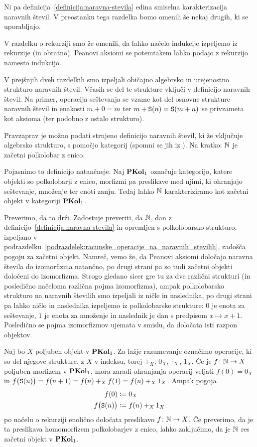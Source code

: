 Ni pa definicija~\ref{definicija:naravna-stevila} edina smiselna karakterizacija naravnih števil. V preostanku tega razdelka bomo omenili še nekaj drugih, ki se uporabljajo.

V razdelku o rekurziji smo že omenili, da lahko načelo indukcije izpeljemo iz rekurzije (in obratno). Peanovi aksiomi se potemtakem lahko podajo z rekurzijo namesto indukcijo.

V prejšnjih dveh razdelkih smo izpeljali običajno algebrsko in urejenostno strukturo naravnih števil. Včasih se del te strukture vključi v definicijo naravnih števil. Na primer, operacija seštevanja se vzame kot del osnovne strukture naravnih števil in enakosti $m + 0 = m$ ter $m + \mathtt{S}(n) = \mathtt{S}(m + n)$ se privzameta kot aksioma (ter podobno z ostalo strukturo).

Pravzaprav je možno podati strnjeno definicijo naravnih števil, ki že vključuje algebrsko strukturo, s pomočjo kategorij (spomni se jih iz ). Na kratko: $\mathbb{N}$ je začetni polkolobar z enico.

Pojasnimo to definicijo natančneje. Naj $\mathbf{PKol}_1$ označuje kategorijo, katere objekti so polkolobarji z enico, morfizmi pa preslikave med njimi, ki ohranjajo seštevanje, množenje ter enoti zanju. Tedaj lahko $\mathbb{N}$ karakteriziramo kot začetni objekt v kategoriji $\mathbf{PKol}_1$.

Preverimo, da to drži. Zadostuje preveriti, da $\mathbb{N}$, dan z definicijo~\ref{definicija:naravna-stevila} in opremljen s polkolobarsko strukturo, izpeljano v podrazdelku~\ref{podrazdelek:racunske_operacije_na_naravnih_stevilih}, zadošča pogoju za začetni objekt. Namreč, vemo že, da Peanovi aksiomi določajo naravna števila do izomorfizma natančno, po drugi strani pa so tudi začetni objekti določeni do izomorfizma. Strogo gledano sicer gre tu za dve različni strukturi (in posledično načeloma različna pojma izomorfizma), ampak polkolobarsko strukturo na naravnih številih smo izpeljali iz ničle in naslednika, po drugi strani pa lahko ničlo in naslednika izpeljemo iz polkolobarske strukture: $0$ je enota za seštevanje, $1$ je enota za množenje in naslednik je dan s predpisom $x \mapsto x + 1$. Posledično se pojma izomorfizmov ujemata v smislu, da določata isti razpon objektov.

Naj bo $X$ poljuben objekt v $\mathbf{PKol}_1$. Za lažje razumevanje označimo operacije, ki so del njegove strukture, z $X$ v indeksu, torej $+_X$, $0_X$, $\cdot_X$, $1_X$. Če je $f\colon \mathbb{N} \to X$ poljuben morfizem v $\mathbf{PKol}_1$, mora zaradi ohranjanja operacij veljati $f(0) = 0_X$ in $f\big(\mathtt{S}(n)\big) = f(n + 1) = f(n) +_X f(1) = f(n) +_X 1_X$. Ampak pogoja
\begin{align*}
f(0) &\mathrel{\mathop:}= 0_X \\
f\big(\mathtt{S}(n)\big) &\mathrel{\mathop:}= f(n) +_X 1_X
\end{align*}
po načelu o rekurziji enolično določata preslikavo $f\colon \mathbb{N} \to X$. Če preverimo, da je ta preslikava homomorfizem polkolobarjev z enico, lahko zaključimo, da je $\mathbb{N}$ res začetni objekt v $\mathbf{PKol}_1$.


